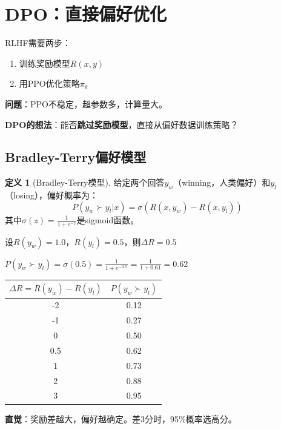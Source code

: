 \documentclass[11pt,a4paper]{article}
\theoremstyle{definition}
\newtheorem{definition}{定义}[section]
\begin{document}
\section{DPO：直接偏好优化}

\begin{plainwords}[RLHF的问题]
RLHF需要两步：
\begin{enumerate}
    \item 训练奖励模型$R(x, y)$
    \item 用PPO优化策略$\pi_\theta$
\end{enumerate}

\textbf{问题}：PPO不稳定，超参数多，计算量大。

\textbf{DPO的想法}：能否\textbf{跳过奖励模型}，直接从偏好数据训练策略？
\end{plainwords}

\subsection{Bradley-Terry偏好模型}

\begin{definition}[Bradley-Terry模型]
给定两个回答$y_w$（winning，人类偏好）和$y_l$（losing），偏好概率为：
\[
P(y_w \succ y_l | x) = \sigma(R(x, y_w) - R(x, y_l))
\]
其中$\sigma(z) = \frac{1}{1 + e^{-z}}$是sigmoid函数。
\end{definition}

\begin{calculation}
设$R(y_w) = 1.0$，$R(y_l) = 0.5$，则$\Delta R = 0.5$

$P(y_w \succ y_l) = \sigma(0.5) = \frac{1}{1 + e^{-0.5}} = \frac{1}{1 + 0.61} = 0.62$

\begin{center}
\begin{tabular}{c|c}
\toprule
$\Delta R = R(y_w) - R(y_l)$ & $P(y_w \succ y_l)$ \\
\midrule
-2 & 0.12 \\
-1 & 0.27 \\
0 & 0.50 \\
0.5 & 0.62 \\
1 & 0.73 \\
2 & 0.88 \\
3 & 0.95 \\
\bottomrule
\end{tabular}
\end{center}

\textbf{直觉}：奖励差越大，偏好越确定。差3分时，95\%概率选高分。
\end{calculation}
\end{document}
